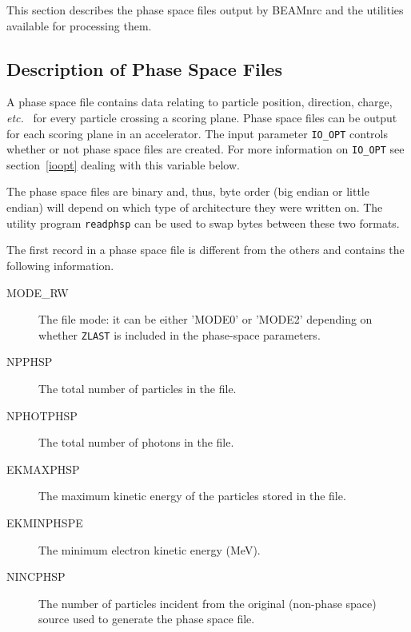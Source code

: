 \documentclass[12pt,twoside]{article}
\newcommand{\etc}{{\em etc.}}
\begin{document}
This section describes the phase space files output by BEAMnrc and the
utilities available for processing them.

\subsection{Description of Phase Space Files}
\label{DPSF}
A phase space file contains data relating to particle position, direction,
charge, \etc~ for every particle crossing a scoring plane.  Phase space
files can be output for each scoring plane in an accelerator.  The input
parameter \verb+IO_OPT+ controls whether or not phase space files are
created.  For more information on \verb+IO_OPT+ see section~\ref{ioopt}
dealing with this variable below.  

The phase space files are binary and, thus, byte order (big endian or little
endian) will depend on which type of architecture they were written on.  The
utility program \verb+readphsp+ can be used to swap bytes between these two
formats.

The first record in a phase space file is different from the others and contains
the following information.
\begin{description}
\item [MODE\_RW] The file mode: it can be either 'MODE0' or 'MODE2' depending
on whether
\verb+ZLAST+ is included in the phase-space parameters.
\item [NPPHSP] The total number of particles in the file.
\item [NPHOTPHSP] The total number of photons in the file.
\item [EKMAXPHSP] The maximum kinetic energy of the particles stored in
the file.
\item [EKMINPHSPE] The minimum electron kinetic energy (MeV).
\item [NINCPHSP] The number of particles incident from the original (non-phase
               space) source used to generate the phase space file.
\end{description}
\end{document}
